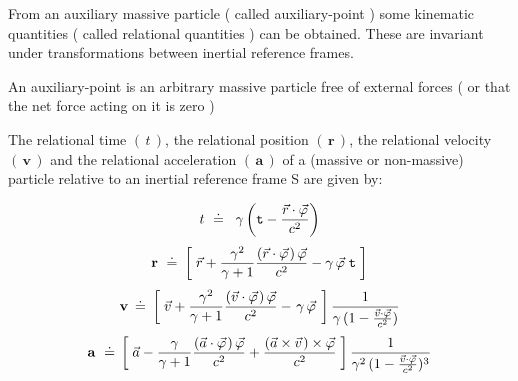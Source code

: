 \documentclass[10pt,fleqn]{article}
\begin{document}
\noindent From an auxiliary massive particle ( called auxiliary-point ) some kinematic quantities ( called relational quantities ) can be obtained. These are invariant under transformations between inertial reference frames.
\par \bigskip \smallskip
\noindent An auxiliary-point is an arbitrary massive particle free of external forces ( or that the net force acting on it is zero )
\par \bigskip \smallskip
\noindent The relational time $( \, t \, )$, the relational position $( \, \mathbf{r} \, )$, the relational velocity $( \, \mathbf{v} \, )$ and the relational acceleration $( \, \mathbf{a} \, )$ of a (massive or non-massive) particle \hbox {relative} to an inertial reference frame S are given by:
\par \vspace{+0.21em}
\begin{eqnarray*}
t ~\doteq~ \hspace{+0.24em} \gamma \left ( \mathtt{t} - \frac{\vec{r} \cdot \vec{\varphi}}{c^2} \right )
\end{eqnarray*}
\vspace{-0.45em}
\begin{eqnarray*}
\mathbf{r} ~\doteq~ \hspace{-0.09em} \left [ \; \vec{r} + \frac{\gamma^2}{\gamma + 1} \frac{( \vec{r} \cdot \vec{\varphi} \hspace{+0.09em}) \, \vec{\varphi}}{c^2} - \gamma \, \vec{\varphi} \; \mathtt{t} \; \right ]
\end{eqnarray*}
\vspace{-0.30em}
\begin{eqnarray*}
\mathbf{v} \hspace{-0.12em} ~\doteq~ \hspace{-0.12em} \left [ \; \vec{v} + \frac{\gamma^2}{\gamma + 1} \frac{( \vec{v} \cdot \vec{\varphi} \hspace{+0.09em}) \, \vec{\varphi}}{c^2} - \hspace{+0.114em} \gamma \, \vec{\varphi} \hspace{+0.114em} \; \right ] \frac{1}{\gamma \, ( 1 - \frac{\vec{v} \cdot \vec{\varphi}}{c^2} )}
\end{eqnarray*}
\vspace{-0.30em}
\begin{eqnarray*}
\mathbf{a} ~\doteq~ \hspace{-0.18em} \left [ \; \vec{a} - \frac{\gamma}{\gamma + 1} \frac{( \vec{a} \cdot \vec{\varphi} \hspace{+0.09em}) \, \vec{\varphi}}{c^2} + \frac{( \vec{a} \times \vec{v} \hspace{+0.09em}) \times \vec{\varphi}}{c^2} \; \right ] \frac{1}{\gamma^2 \, ( 1 - \frac{\vec{v} \cdot \vec{\varphi}}{c^2} )^3}
\end{eqnarray*}
\end{document}
